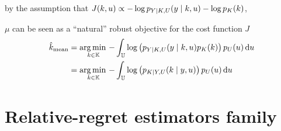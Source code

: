 \documentclass[../../Main_ManuscritThese.tex]{subfiles}
\begin{document}
by the assumption that $J(k,u) \propto -\log p_{Y \mid K,U}(y \mid k,u)- \log p_{K}(k)$,

$\mu$ can be seen as a ``natural'' robust objective for the cost function $J$
\begin{align}
  \hat{k}_{\mathrm{mean}} &= \operatorname*{arg\,min \,}_{k\in\mathbb{K}}-\int_{\mathbb{U}}\log\left(p_{Y \mid K,U}(y \mid k,u)p_{K}(k)\right)p_{U}(u)\,\mathrm{d}u \\
                     &= \operatorname*{arg\,min \,}_{k\in\mathbb{K}}-\int_{\mathbb{U}}\log\left(p_{K \mid Y,U}(k \mid y,u)\right)p_{U}(u)\,\mathrm{d}u 
\end{align}


\section{Relative-regret estimators family}
\label{sec:rr_family}



\subfileLocal{
	\pagestyle{empty}
	
	
      }
\end{document}

